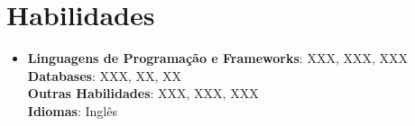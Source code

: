 \documentclass[letterpaper,11pt]{article}
\begin{document}
\section{Habilidades}
\begin{itemize}[leftmargin=0.15in, label={}]
    \item\small{
        \textbf{Linguagens de Programação e Frameworks}{: XXX, XXX, XXX} \\
        \textbf{Databases}{: XXX, XX, XX} \\
        \textbf{Outras Habilidades}{: XXX, XXX, XXX} \\
        \textbf{Idiomas}{: Inglês}}
    \vspace{-4pt}
\end{itemize}

\end{document}
